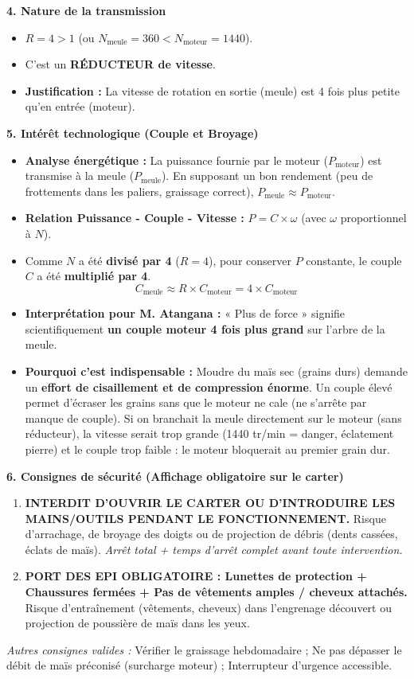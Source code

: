 \documentclass[11pt]{article}
\begin{document}
\begin{exoresolu}
\textbf{4. Nature de la transmission}
\begin{itemize}
    \item $R = 4 > 1$ (ou $N_{\text{meule}} = 360 < N_{\text{moteur}} = 1440$).
    \item C'est un \textbf{RÉDUCTEUR de vitesse}.
    \item \textbf{Justification :} La vitesse de rotation en sortie (meule) est 4 fois plus petite qu'en entrée (moteur).
\end{itemize}

\textbf{5. Intérêt technologique (Couple et Broyage)}
\begin{itemize}
    \item \textbf{Analyse énergétique :} La puissance fournie par le moteur ($P_{\text{moteur}}$) est transmise à la meule ($P_{\text{meule}}$). En supposant un bon rendement (peu de frottements dans les paliers, graissage correct), $P_{\text{meule}} \approx P_{\text{moteur}}$.
    \item \textbf{Relation Puissance - Couple - Vitesse :} $P = C \times \omega$ (avec $\omega$ proportionnel à $N$).
    \item Comme $N$ a été \textbf{divisé par 4} ($R=4$), pour conserver $P$ constante, le couple $C$ a été \textbf{multiplié par 4}.
    \[
    C_{\text{meule}} \approx R \times C_{\text{moteur}} = 4 \times C_{\text{moteur}}
    \]
    \item \textbf{Interprétation pour M. Atangana :} « Plus de force » signifie scientifiquement \textbf{un couple moteur 4 fois plus grand} sur l'arbre de la meule.
    \item \textbf{Pourquoi c'est indispensable :} Moudre du maïs sec (grains durs) demande un \textbf{effort de cisaillement et de compression énorme}. Un couple élevé permet d'écraser les grains sans que le moteur ne cale (ne s'arrête par manque de couple). Si on branchait la meule directement sur le moteur (sans réducteur), la vitesse serait trop grande (1440 tr/min = danger, éclatement pierre) et le couple trop faible : le moteur bloquerait au premier grain dur.
\end{itemize}

\textbf{6. Consignes de sécurité (Affichage obligatoire sur le carter)}
\begin{enumerate}
    \item \textbf{INTERDIT D'OUVRIR LE CARTER OU D'INTRODUIRE LES MAINS/OUTILS PENDANT LE FONCTIONNEMENT.} Risque d'arrachage, de broyage des doigts ou de projection de débris (dents cassées, éclats de maïs). \emph{Arrêt total + temps d'arrêt complet avant toute intervention.}
    \item \textbf{PORT DES EPI OBLIGATOIRE : Lunettes de protection + Chaussures fermées + Pas de vêtements amples / cheveux attachés.} Risque d'entraînement (vêtements, cheveux) dans l'engrenage découvert ou projection de poussière de maïs dans les yeux.
\end{enumerate}
\emph{Autres consignes valides :} Vérifier le graissage hebdomadaire ; Ne pas dépasser le débit de maïs préconisé (surcharge moteur) ; Interrupteur d'urgence accessible.


\end{exoresolu}
\end{document}
